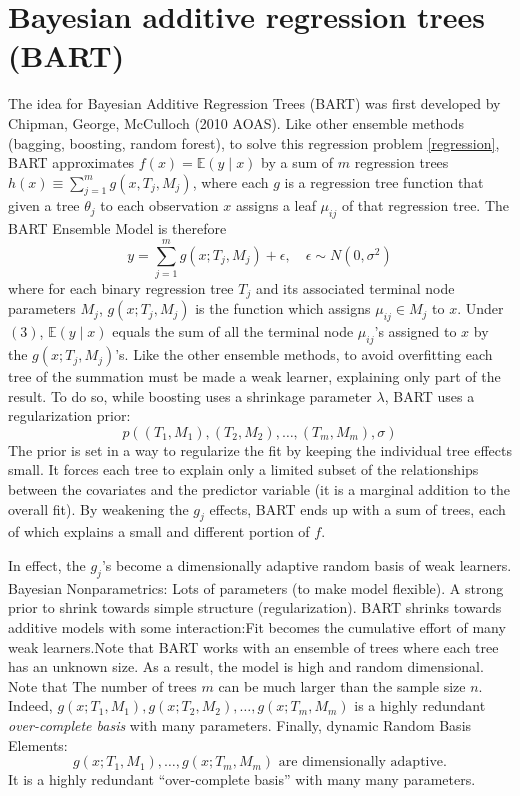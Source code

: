 \documentclass[a4paper,11pt]{article}
\begin{document}
\section{Bayesian additive regression trees (BART)}
The idea for Bayesian Additive Regression Trees (BART) was first developed by Chipman, George, McCulloch (2010 AOAS). Like other ensemble methods (bagging, boosting, random forest), to solve this regression problem \eqref{regression}, BART approximates \( f(x) = \mathbb{E}(y \mid x) \) by a sum of $m$ regression trees \( h(x) \equiv \sum_{j=1}^m g(x, T_j, M_j)\), where each \( g \) is a regression tree function that given a tree $\theta_j$ to each observation $x$  assigns a leaf $\mu_{ij}$ of that regression tree.
The BART Ensemble Model is therefore
\[
y = \sum_{j=1}^m g(x; T_j, M_j) + \epsilon, \quad \epsilon \sim N(0, \sigma^2) \tag{3}
\]
where for each binary regression tree \( T_j \) and its associated terminal node parameters \( M_j \), \( g(x; T_j, M_j) \) is the function which assigns \( \mu_{ij} \in M_j \) to \( x \). Under \((3)\), \( \mathbb{E}(y \mid x) \) equals the sum of all the terminal node \( \mu_{ij} \)'s assigned to \( x \) by the \( g(x; T_j, M_j) \)'s.
Like the other ensemble methods, to avoid overfitting each tree of the summation must be made a weak learner, explaining only part of the result. To do so, while boosting uses a shrinkage parameter $\lambda$, BART uses a regularization prior:
\[
p((T_1, M_1), (T_2, M_2), \ldots, (T_m, M_m), \sigma)
\]
The prior is set in a way to regularize the fit by keeping the individual tree effects small. It forces each tree to explain only a limited subset of the relationships between the covariates and the predictor variable (it is a marginal addition to the overall fit). By weakening the \( g_j \) effects, BART ends up with a sum of trees, each of which explains a small and different portion of \( f \).


In effect, the \( g_j \)'s become a dimensionally adaptive random basis of weak learners. Bayesian Nonparametrics: Lots of parameters (to make model flexible).
A strong prior to shrink towards simple structure (regularization). BART shrinks towards additive models with some interaction:Fit becomes the cumulative effort of many weak learners.Note that BART works with an ensemble of trees where each tree has an unknown size. As a result, the model is high and random dimensional.  Note that The number of trees $m$ can be much larger than the sample size $n$. Indeed, $g(x; T_1, M_1), g(x; T_2, M_2), \ldots, g(x; T_m, M_m)$ is a highly redundant \textit{over-complete basis} with many parameters.
Finally, dynamic Random Basis Elements:
\[
g(x; T_1, M_1), \ldots, g(x; T_m, M_m) \text{ are dimensionally adaptive.}
\]
It is a highly redundant “over-complete basis” with many many parameters.
\end{document}
